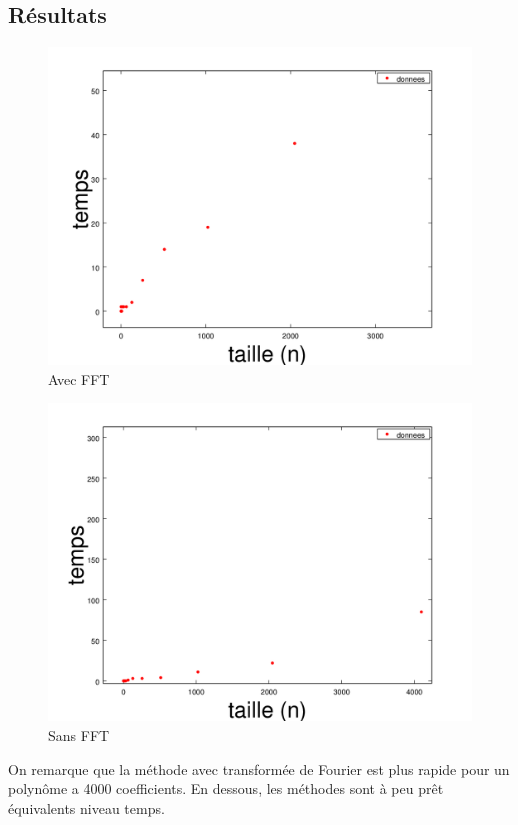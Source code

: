 \documentclass{article}
\begin{document}
\subsection{Résultats}

\begin{figure}
	\begin{center}
		\includegraphics[scale=0.7]{FFTSmall}\\
		Avec FFT
	\end{center}
\end{figure}
\begin{figure}
	\begin{center}
		\includegraphics[scale=0.7]{NoFFTSmall}\\
		Sans FFT
	\end{center}
\end{figure}
On remarque que la méthode avec transformée de Fourier est plus rapide pour un polynôme a 4000 coefficients. En dessous, les méthodes sont à peu prêt équivalents niveau temps.
\end{document}
